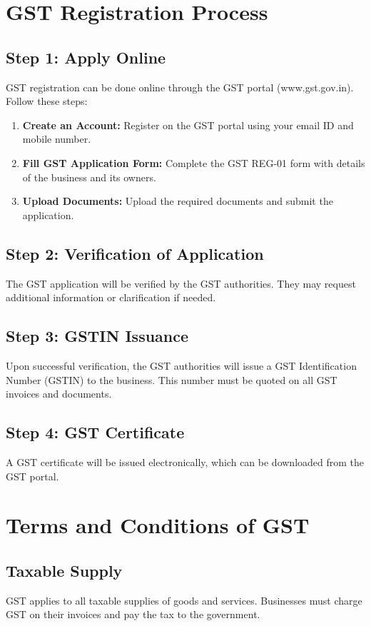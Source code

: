 \documentclass[a4paper,12pt]{report}
\begin{document}
\section{GST Registration Process}
\subsection{Step 1: Apply Online}
GST registration can be done online through the GST portal (www.gst.gov.in). Follow these steps:
\begin{enumerate}
    \item \textbf{Create an Account:} Register on the GST portal using your email ID and mobile number.
    \item \textbf{Fill GST Application Form:} Complete the GST REG-01 form with details of the business and its owners.
    \item \textbf{Upload Documents:} Upload the required documents and submit the application.
\end{enumerate}

\subsection{Step 2: Verification of Application}
The GST application will be verified by the GST authorities. They may request additional information or clarification if needed.

\subsection{Step 3: GSTIN Issuance}
Upon successful verification, the GST authorities will issue a GST Identification Number (GSTIN) to the business. This number must be quoted on all GST invoices and documents.

\subsection{Step 4: GST Certificate}
A GST certificate will be issued electronically, which can be downloaded from the GST portal.

\section{Terms and Conditions of GST}
\subsection{Taxable Supply}
GST applies to all taxable supplies of goods and services. Businesses must charge GST on their invoices and pay the tax to the government.
\end{document}
